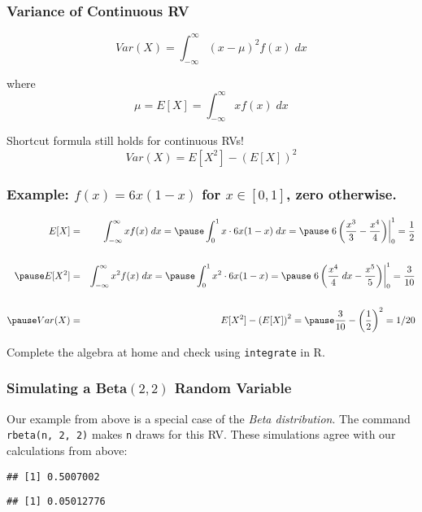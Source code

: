 \begin{frame}
\frametitle{Variance of Continuous RV}

$$\boxed{Var(X) = \int_{-\infty}^{\infty} (x - \mu)^2 f(x) \; dx}$$

\vspace{2em}
where
$$\mu = E[X]=\int_{-\infty}^\infty x f(x) \; dx $$

\vspace{2em}
\alert{Shortcut formula still holds for continuous RVs!}
	$$Var(X) = E[X^2] - \left(E[X]\right)^2$$
\end{frame}
\begin{frame}
  \frametitle{Example: $f(x) = 6x(1-x)$ for $x \in [0,1]$, zero otherwise.}

  \small
    \begin{eqnarray*}
      E[X] &=& \int_{-\infty}^{\infty} x f(x)\; dx =\pause \int_0^1 x \cdot 6x(1-x) \; dx=\pause \left. 6\left( \frac{x^3}{3} - \frac{x^4}{4} \right)\right|_{0}^1 = \frac{1}{2}\\ \\ 
      \pause
      E[X^2] &=& \int_{-\infty}^{\infty} x^2 f(x)\; dx =\pause \int_0^1 x^2 \cdot 6x(1-x) = \pause \left. 6\left( \frac{x^4}{4}\; dx - \frac{x^5}{5} \right) \right|_0^1 = \frac{3}{10} \\ \\ 
      \pause
      Var(X) &=& E[X^2] - \left(E[X]\right)^2 = \pause \frac{3}{10} - \left( \frac{1}{2} \right)^2 = 1/20 
    \end{eqnarray*}

    \alert{Complete the algebra at home and check using \texttt{integrate} in R.}
\end{frame}
\begin{frame}[fragile]
  \frametitle{Simulating a Beta$(2, 2)$ Random Variable}
  Our example from above is a special case of the \emph{\alert{Beta distribution}}.
  The command \texttt{rbeta(n, 2, 2)} makes \texttt{n} draws for this RV.
  These simulations agree with our calculations from above:

\begin{knitrout}
\color{fgcolor}\begin{kframe}
\begin{alltt}
\hlstd{(}\hlstd{)}
 \hlkwb{<-} \hlstd{(}\hlstd{,} \hlstd{,} \hlstd{)}
\end{alltt}
\begin{verbatim}
## [1] 0.5007002
\end{verbatim}
\begin{alltt}
\end{alltt}
\begin{verbatim}
## [1] 0.05012776
\end{verbatim}
\end{kframe}
\end{knitrout}


\end{frame}
